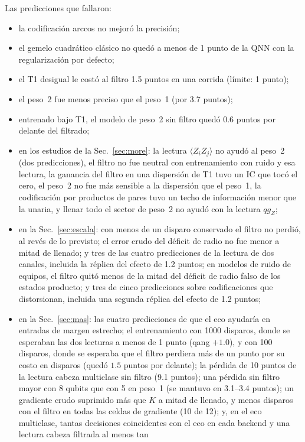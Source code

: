 \documentclass[11pt]{article}
\newcommand{\qZ}{qg_Z}
\begin{document}
Las predicciones que fallaron:
\begin{itemize}
\item la codificación arccos no mejoró la precisión;
\item el gemelo cuadrático clásico no quedó a menos de 1 punto de la QNN con la regularización por defecto;
\item el T1 desigual le costó al filtro 1.5 puntos en una corrida (límite: 1 punto);
\item el peso~2 fue menos preciso que el peso~1 (por 3.7 puntos);
\item entrenado bajo T1, el modelo de peso~2 sin filtro quedó 0.6 puntos por delante del filtrado;
\item en los estudios de la Sec.~\ref{sec:more}: la lectura $\langle Z_iZ_j\rangle$ no ayudó al peso~2 (dos
  predicciones), el filtro no fue neutral con entrenamiento con ruido y esa lectura, la ganancia del filtro
  en una dispersión de T1 tuvo un IC que tocó el cero, el peso~2 no fue más sensible a la dispersión que el
  peso~1, la codificación por productos de pares tuvo un techo de información menor que la unaria, y llenar todo el
  sector de peso~2 no ayudó con la lectura $\qZ$;
\item en la Sec.~\ref{sec:escala}: con menos de un disparo conservado el filtro no perdió, al revés de lo previsto;
  el error crudo del déficit de radio no fue menor a mitad de llenado; y tres de las cuatro predicciones de la
  lectura de dos canales, incluida la réplica del efecto de 1.2 puntos; en modelos de ruido de equipos, el filtro
  quitó menos de la mitad del déficit de radio falso de los estados producto; y tres de cinco predicciones sobre
  codificaciones que distorsionan, incluida una segunda réplica del efecto de 1.2 puntos;
\item en la Sec.~\ref{sec:mas}: las cuatro predicciones de que el eco ayudaría en entradas de margen estrecho; el
  entrenamiento con 1000 disparos, donde se esperaban las dos lecturas a menos de 1 punto (qang $+1.0$), y con 100
  disparos, donde se esperaba que el filtro perdiera más de un punto por su costo en disparos (quedó $1.5$ puntos por
  delante); la pérdida de 10 puntos de la lectura cabeza multiclase sin filtro (9.1 puntos); una pérdida sin filtro
  mayor con 8 qubits que con 5 en peso~1 (se mantuvo en 3.1--3.4 puntos); un gradiente crudo suprimido más que $K$ a
  mitad de llenado, y menos disparos con el filtro en todas las celdas de gradiente (10 de 12); y, en el eco
  multiclase, tantas decisiones coincidentes con el eco en cada backend y una lectura cabeza filtrada al menos tan

\end{itemize}
\end{document}
